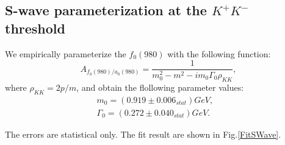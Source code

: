 \subsection{S-wave parameterization at the $K^{+}K^{-}$ threshold}
\par{We empirically parameterize the $f_{0}(980)$ with the following function:
    \begin{equation}
        A_{f_{0}(980) / a_{0}(980)} = \frac{1}{m_{0}^{2} - m^{2} -im_{0}\Gamma_{0}\rho_{KK}}, \label{a0980-RBW}
    \end{equation}
    where $\rho_{KK} = 2p/m$, and obtain the flollowing parameter values:
    \begin{equation}
        \begin{array}{lr}
            m_{0} = (0.919 \pm 0.006_{stat}) GeV, &\\
            \Gamma_{0} = (0.272 \pm 0.040_{stat}) GeV. &
        \end{array}\label{S-wave parameters} 
    \end{equation}


    The errors are statistical only. The fit result are shown in Fig.\ref{FitSWave}.
    
}

